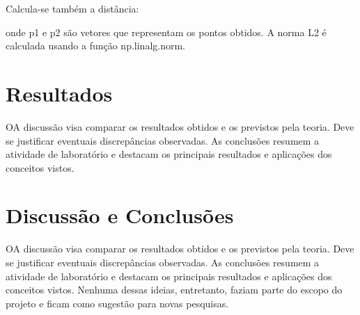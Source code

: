 \documentclass[conference]{IEEEtran}
\begin{document}
Calcula-se também a distância:

onde  p1 e p2 são vetores que representam os pontos obtidos.  A norma L2 é calculada usando a função np.linalg.norm.

\section{Resultados}
OA discussão visa comparar os resultados obtidos e os previstos pela teoria. Deve se justificar eventuais discrepâncias observadas. As conclusões resumem a atividade de laboratório e destacam os principais resultados e aplicações dos conceitos vistos.
\section{Discussão e Conclusões}
OA discussão visa comparar os resultados obtidos e os previstos pela teoria. Deve se justificar eventuais discrepâncias observadas. As conclusões resumem a atividade de laboratório e destacam os principais resultados e aplicações dos conceitos vistos.
Nenhuma dessas ideias, entretanto, faziam parte do escopo do projeto e ficam como sugestão para novas pesquisas.



\end{document}
